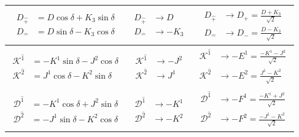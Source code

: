 \documentclass[foundations,article,submit,pdftex,moreauthors]{Definitions/mdpi}
\begin{document}
\begin{table}[htpb!]
\begin{tabular}{@{}ccc@{}}
\midrule

$\begin{aligned}
D_{\hat{+}} &= D\cos\delta + K_3\sin\delta \\
D_{\hat{-}} &= D\sin\delta - K_3\cos\delta
\end{aligned}$ &
$\begin{aligned}
D_{\hat{+}} &\to D \\
D_{\hat{-}} &\to -K_3
\end{aligned}$ &
$\begin{aligned}
D_{\hat{+}} &\to D_{+} = \frac{D + K_3}{\sqrt{2}} \\
D_{\hat{-}} &\to D_{-} = \frac{D - K_3}{\sqrt{2}}
\end{aligned}$ \\

\midrule

$\begin{aligned}
\mathcal{K}^{\hat{1}} &= -K^1\sin\delta - J^2\cos\delta \\
\mathcal{K}^{\hat{2}} &= J^1\cos\delta - K^2\sin\delta
\end{aligned}$ &
$\begin{aligned}
\mathcal{K}^{\hat{1}} &\to -J^2 \\
\mathcal{K}^{\hat{2}} &\to J^1
\end{aligned}$ &
$\begin{aligned}
\mathcal{K}^{\hat{1}} &\to -E^1 = \frac{-K^1 - J^2}{\sqrt{2}} \\
\mathcal{K}^{\hat{2}} &\to -E^2 = \frac{J^1 - K^2}{\sqrt{2}}
\end{aligned}$ \\

\midrule

$\begin{aligned}
\mathcal{D}^{\hat{1}} &= -K^1\cos\delta + J^2\sin\delta \\
\mathcal{D}^{\hat{2}} &= -J^1\sin\delta - K^2\cos\delta
\end{aligned}$ &
$\begin{aligned}
\mathcal{D}^{\hat{1}} &\to -K^1 \\
\mathcal{D}^{\hat{2}} &\to -K^2
\end{aligned}$ &
$\begin{aligned}
\mathcal{D}^{\hat{1}} &\to -F^1 = \frac{-K^1 + J^2}{\sqrt{2}} \\
\mathcal{D}^{\hat{2}} &\to -F^2 = \frac{-J^1 - K^2}{\sqrt{2}}
\end{aligned}$ \\


\end{tabular}
\end{table}
\end{document}
